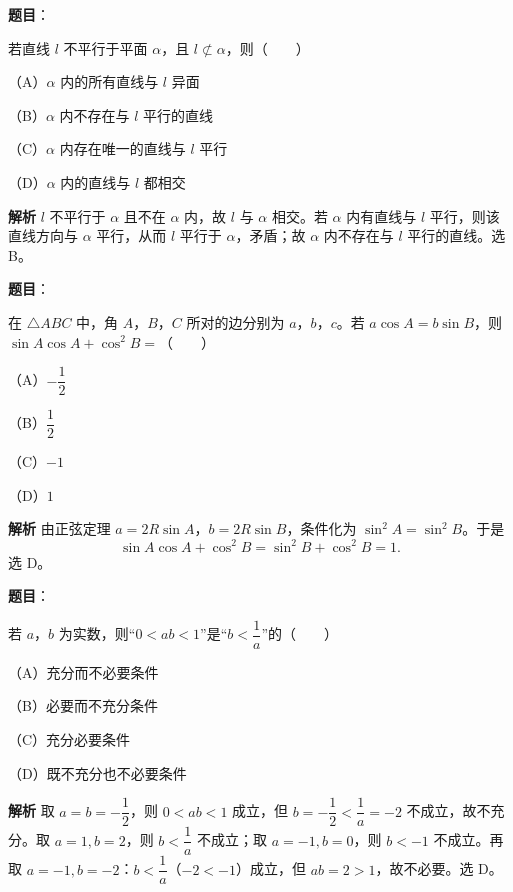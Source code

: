\begin{answer}

\textbf{题目}：

若直线 $l$ 不平行于平面 $\alpha$，且 $l\not\subset\alpha$，则\mbox{（　　）}

（A）$\alpha$ 内的所有直线与 $l$ 异面

（B）$\alpha$ 内不存在与 $l$ 平行的直线

（C）$\alpha$ 内存在唯一的直线与 $l$ 平行

（D）$\alpha$ 内的直线与 $l$ 都相交

\textbf{解析}
$l$ 不平行于 $\alpha$ 且不在 $\alpha$ 内，故 $l$ 与 $\alpha$ 相交。若 $\alpha$ 内有直线与 $l$ 平行，则该直线方向与 $\alpha$ 平行，从而 $l$ 平行于 $\alpha$，矛盾；故 $\alpha$ 内不存在与 $l$ 平行的直线。选 B。


\end{answer}
\begin{answer}

\textbf{题目}：

在 $\triangle ABC$ 中，角 $A$，$B$，$C$ 所对的边分别为 $a$，$b$，$c$。若 $a\cos A=b\sin B$，则 $\sin A\cos A+\cos^2B=$\mbox{（　　）}

（A）$-\dfrac12$

（B）$\dfrac12$

（C）$-1$

（D）$1$

\textbf{解析}
由正弦定理 $a=2R\sin A$，$b=2R\sin B$，条件化为 $\sin^2A=\sin^2B$。于是
\nopagebreak[4]
\[\sin A\cos A+\cos^2B=\sin^2B+\cos^2B=1.\]
选 D。


\end{answer}
\begin{answer}

\textbf{题目}：

若 $a$，$b$ 为实数，则“$0<ab<1$”是“$b<\dfrac1a$”的\mbox{（　　）}

（A）充分而不必要条件

（B）必要而不充分条件

（C）充分必要条件

（D）既不充分也不必要条件

\textbf{解析}
取 $a=b=-\dfrac12$，则 $0<ab<1$ 成立，但 $b=-\dfrac12<\dfrac1a=-2$ 不成立，故不充分。取 $a=1,b=2$，则 $b<\dfrac1a$ 不成立；取 $a=-1,b=0$，则 $b< -1$ 不成立。再取 $a=-1,b=-2$：$b<\dfrac1a$（$-2<-1$）成立，但 $ab=2>1$，故不必要。选 D。


\end{answer}
